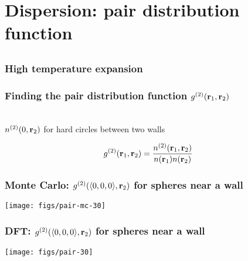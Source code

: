 
\section{Dispersion: pair distribution function}

\subsection{}

\begin{frame}
  \frametitle{High temperature expansion}
\end{frame}

\begin{frame}
  \frametitle{Finding the pair distribution function $g^{(2)}(\mathbf{r}_1,\mathbf{r}_2)$}
  \vspace{-0.8em}
  \begin{center}
    \\
    \vspace{-4.0em}
    $n^{(2)}(0,\mathbf{r}_2)$ for hard circles between two walls
  \end{center}
  \begin{align*}
    g^{(2)}(\mathbf{r}_1,\mathbf{r}_2) &= \frac{n^{(2)}(\mathbf{r}_1,\mathbf{r}_2)}{n(\mathbf{r}_1)n(\mathbf{r}_2)}
  \end{align*}
\end{frame}

\begin{frame}
  \frametitle{Monte Carlo: $g^{(2)}(\langle 0,0,0\rangle,\mathbf{r}_2)$ for spheres near a wall}
  \texttt{[image: figs/pair-mc-30]}
\end{frame}

\begin{frame}
  \frametitle{DFT: $g^{(2)}(\langle 0,0,0\rangle,\mathbf{r}_2)$ for spheres near a wall}
  \texttt{[image: figs/pair-30]}
\end{frame}

